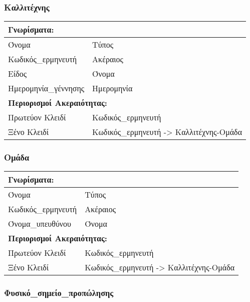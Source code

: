 \subsubsection*{Καλλιτέχνης}

\begin{tabular}{|p{6cm}|p{8cm}|}
  \multicolumn{2}{l}{\textbf{Γνωρίσματα:}}                       \\ \hline
  Όνομα                & Τύπος                                   \\ \hline
  Κωδικός\_ερμηνευτή   & Ακέραιος                                \\ \hline
  Είδος                & Όνομα                                   \\ \hline
  Ημερομηνία\_γέννησης & Ημερομηνία                              \\ \hline
  \multicolumn{2}{l}{\textbf{Περιορισμοί Ακεραιότητας:}}         \\ \hline
  Πρωτεύον Κλειδί      & Κωδικός\_ερμηνευτή                      \\ \hline
  Ξένο Κλειδί          & Κωδικός\_ερμηνευτή -> Καλλιτέχνης-Ομάδα \\ \hline
\end{tabular}

\subsubsection*{Ομάδα}

\begin{tabular}{|p{6cm}|p{8cm}|}
  \multicolumn{2}{l}{\textbf{Γνωρίσματα:}}                     \\ \hline
  Όνομα              & Τύπος                                   \\ \hline
  Κωδικός\_ερμηνευτή & Ακέραιος                                \\ \hline
  Όνομα\_υπευθύνου   & Όνομα                                   \\ \hline
  \multicolumn{2}{l}{\textbf{Περιορισμοί Ακεραιότητας:}}       \\ \hline
  Πρωτεύον Κλειδί    & Κωδικός\_ερμηνευτή                      \\ \hline
  Ξένο Κλειδί        & Κωδικός\_ερμηνευτή -> Καλλιτέχνης-Ομάδα \\ \hline
\end{tabular}


\subsubsection*{Φυσικό\_σημείο\_προπώλησης}

